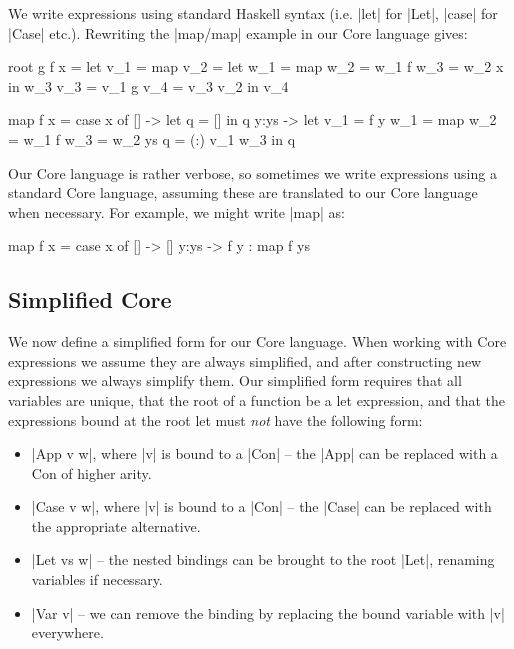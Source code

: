 \documentclass[draft]{sigplanconf}
\begin{document}
We write expressions using standard Haskell syntax (i.e. |let| for |Let|, |case| for |Case| etc.). Rewriting the |map/map| example in our Core language gives:

\begin{code}
root g f x =  let  v_1 =  map
                   v_2 =  let  w_1 = map
                               w_2 = w_1 f
                               w_3 = w_2 x
                          in   w_3
                   v_3 =  v_1 g
                   v_4 =  v_3 v_2
              in   v_4

map f x = case  x of
                []    ->   let  q    = []
                           in   q
                y:ys  ->   let  v_1  = f y
                                w_1  = map
                                w_2  = w_1 f
                                w_3  = w_2 ys
                                q    = (:) v_1 w_3
                           in   q
\end{code}

Our Core language is rather verbose, so sometimes we write expressions using a standard Core language, assuming these are translated to our Core language when necessary. For example, we might write |map| as:

\begin{code}
map f x = case  x of
                []    -> []
                y:ys  -> f y : map f ys
\end{code}

\subsection{Simplified Core}
\label{sec:simplify}

We now define a simplified form for our Core language. When working with Core expressions we assume they are always simplified, and after constructing new expressions we always simplify them. Our simplified form requires that all variables are unique, that the root of a function be a let expression, and that the expressions bound at the root let must \textit{not} have the following form:

\begin{itemize}
\item |App v w|, where |v| is bound to a |Con| -- the |App| can be replaced with a Con of higher arity.
\item |Case v w|, where |v| is bound to a |Con| -- the |Case| can be replaced with the appropriate alternative.
\item |Let vs w| -- the nested bindings can be brought to the root |Let|, renaming variables if necessary.
\item |Var v| -- we can remove the binding by replacing the bound variable with |v| everywhere.
\end{itemize}
\end{document}
